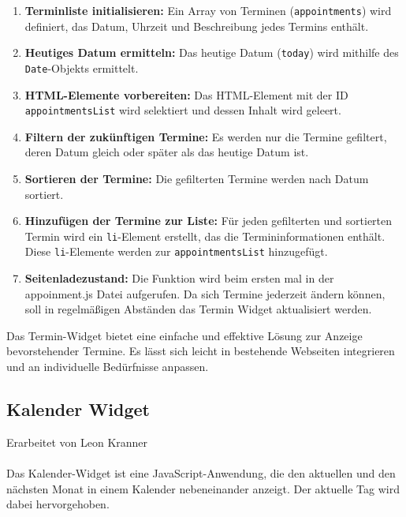 \begin{enumerate}
    \item \textbf{Terminliste initialisieren:}
    Ein Array von Terminen (\texttt{appointments}) wird definiert, das Datum, Uhrzeit und Beschreibung jedes Termins enthält.
    
    \item \textbf{Heutiges Datum ermitteln:}
    Das heutige Datum (\texttt{today}) wird mithilfe des \texttt{Date}-Objekts ermittelt.
    
    \item \textbf{HTML-Elemente vorbereiten:}
    Das HTML-Element mit der ID \texttt{appointmentsList} wird selektiert und dessen Inhalt wird geleert.
    
    \item \textbf{Filtern der zukünftigen Termine:}
    Es werden nur die Termine gefiltert, deren Datum gleich oder später als das heutige Datum ist.
    
    \item \textbf{Sortieren der Termine:}
    Die gefilterten Termine werden nach Datum sortiert.
    
    \item \textbf{Hinzufügen der Termine zur Liste:}
    Für jeden gefilterten und sortierten Termin wird ein \texttt{li}-Element erstellt, das die Termininformationen enthält. Diese \texttt{li}-Elemente werden zur \texttt{appointmentsList} hinzugefügt.
    
    \item \textbf{Seitenladezustand:}
    Die Funktion wird beim ersten mal in der appoinment.js Datei aufgerufen. Da sich Termine jederzeit ändern können, soll in regelmäßigen Abständen das Termin Widget aktualisiert werden.
\end{enumerate}

\noindent
Das Termin-Widget bietet eine einfache und effektive Lösung zur Anzeige bevorstehender Termine. Es lässt sich leicht in bestehende Webseiten integrieren und an individuelle Bedürfnisse anpassen.

\subsection{Kalender Widget}
Erarbeitet von Leon Kranner \\ \\

\noindent
Das Kalender-Widget ist eine JavaScript-Anwendung, die den aktuellen und den nächsten Monat in einem Kalender nebeneinander anzeigt. Der aktuelle Tag wird dabei hervorgehoben. \\


